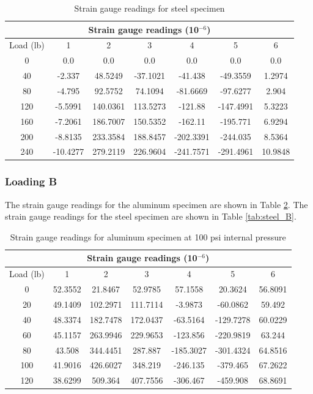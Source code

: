 \documentclass[12pt, titlepage]{article}
\begin{document}
\begin{table}[H]
\begin{tabular}{|c|c|c|c|c|c|c|} \hline
\multicolumn{7}{|c|}{Strain gauge readings (10$^{-6}$)} \\ \hline
Load (lb) & 1 & 2 & 3 & 4 & 5 & 6 \\ \hline
0 & 0.0 & 0.0 & 0.0 & 0.0 & 0.0 & 0.0 \\ \hline
40 & -2.337 & 48.5249 & -37.1021 & -41.438 & -49.3559 & 1.2974 \\ \hline
80 & -4.795 & 92.5752 & 74.1094 & -81.6669 & -97.6277 & 2.904 \\ \hline
120 & -5.5991 & 140.0361 & 113.5273 & -121.88 & -147.4991 & 5.3223 \\ \hline
160 & -7.2061 & 186.7007 & 150.5352 & -162.11 & -195.771 & 6.9294 \\ \hline
200 & -8.8135 & 233.3584 & 188.8457 & -202.3391 & -244.035 & 8.5364 \\ \hline
240 & -10.4277 & 279.2119 & 226.9604 & -241.7571 & -291.4961 & 10.9848 \\ \hline
\end{tabular}
\captionsetup{justification=raggedright,singlelinecheck=false}
\caption{Strain gauge readings for steel specimen}
\label{tab:steel_A}
\end{table}

\subsubsection{Loading B}
The strain gauge readings for the aluminum specimen are shown in Table \ref{tab:alu_B}.
The strain gauge readings for the steel specimen are shown in Table \ref{tab:steel_B}.
\begin{table}[H]
\begin{tabular}{|c|c|c|c|c|c|c|} \hline
\multicolumn{7}{|c|}{Strain gauge readings (10$^{-6}$)} \\ \hline
Load (lb) & 1 & 2 & 3 & 4 & 5 & 6 \\ \hline
0 & 52.3552 & 21.8467 & 52.9785 & 57.1558 & 20.3624 & 56.8091 \\ \hline
20 & 49.1409 & 102.2971 & 111.7114 & -3.9873 & -60.0862 & 59.492 \\ \hline
40 & 48.3374 & 182.7478 & 172.0437 & -63.5164 & -129.7278 & 60.0229 \\ \hline
60 & 45.1157 & 263.9946 & 229.9653 & -123.856 & -220.9819 & 63.244 \\ \hline
80 & 43.508 & 344.4451 & 287.887 & -185.3027 & -301.4324 & 64.8516 \\ \hline
100 & 41.9016 & 426.6027 & 348.219 & -246.135 & -379.465 & 67.2622 \\ \hline
120 & 38.6299 & 509.364 & 407.7556 & -306.467 & -459.908 & 68.8691 \\ \hline
\end{tabular}
\captionsetup{justification=raggedright,singlelinecheck=false}
\caption{Strain gauge readings for aluminum specimen at 100 psi internal pressure}
\label{tab:alu_B}
\end{table}
\end{document}
